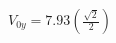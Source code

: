 \documentclass[preview]{standalone}
\begin{document}
\begin{align*}
V_{0y} = 7.93\left(\tfrac{\sqrt{2}}{2}\right)
\end{align*}
\end{document}
